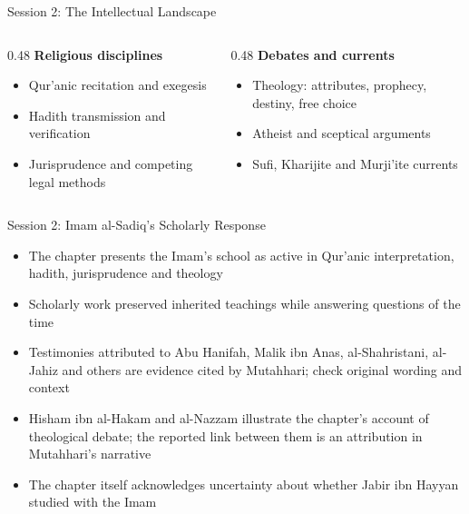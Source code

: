 \begin{frame}{Session 2: The Intellectual Landscape}
\begin{columns}[T]
  \begin{column}{0.48\textwidth}
    \textbf{Religious disciplines}
    \begin{itemize}[itemsep=4pt]
      \item Qur'anic recitation and exegesis
      \item Hadith transmission and verification
      \item Jurisprudence and competing legal methods
    \end{itemize}
  \end{column}
  \begin{column}{0.48\textwidth}
    \textbf{Debates and currents}
    \begin{itemize}[itemsep=4pt]
      \item Theology: attributes, prophecy, destiny, free choice
      \item Atheist and sceptical arguments
      \item Sufi, Kharijite and Murji'ite currents
    \end{itemize}
  \end{column}
\end{columns}
\end{frame}

\begin{frame}{Session 2: Imam al-Sadiq's Scholarly Response}
\begin{itemize}[itemsep=5pt]
  \item The chapter presents the Imam's school as active in Qur'anic interpretation, hadith, jurisprudence and theology
  \item Scholarly work preserved inherited teachings while answering questions of the time
  \item Testimonies attributed to Abu Hanifah, Malik ibn Anas, al-Shahristani, al-Jahiz and others are evidence cited by Mutahhari; check original wording and context
  \item Hisham ibn al-Hakam and al-Nazzam illustrate the chapter's account of theological debate; the reported link between them is an attribution in Mutahhari's narrative
  \item The chapter itself acknowledges uncertainty about whether Jabir ibn Hayyan studied with the Imam
\end{itemize}
\end{frame}

